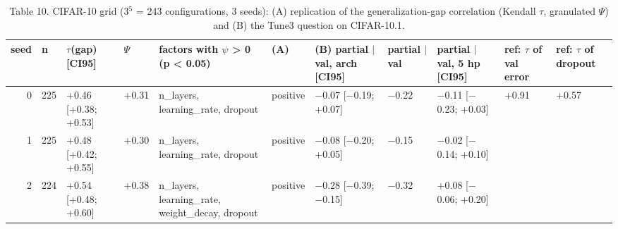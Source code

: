 \begin{table}[t]
\centering\small
\caption{Table 10. CIFAR-10 grid (3$^5$ = 243 configurations, 3 seeds): (A) replication of the generalization-gap correlation (Kendall $\tau$, granulated $\Psi$) and (B) the Tune3 question on CIFAR-10.1.}
\label{tab:cifar}
\begin{tabular}{rllllllllll}
\toprule
seed & n & $\tau$(gap) [CI95] & $\Psi$ & factors with $\psi$ > 0 (p < 0.05) & (A) & (B) partial $\mid$ val, arch [CI95] & partial $\mid$ val & partial $\mid$ val, 5 hp [CI95] & ref: $\tau$ of val error & ref: $\tau$ of dropout \\
\midrule
0 & 225 & +0.46 [+0.38; +0.53] & +0.31 & n\_layers, learning\_rate, dropout & positive & $-$0.07 [$-$0.19; +0.07] & $-$0.22 & $-$0.11 [$-$0.23; +0.03] & +0.91 & +0.57 \\
1 & 225 & +0.48 [+0.42; +0.55] & +0.30 & n\_layers, learning\_rate, dropout & positive & $-$0.08 [$-$0.20; +0.05] & $-$0.15 & $-$0.02 [$-$0.14; +0.10] &  &  \\
2 & 224 & +0.54 [+0.48; +0.60] & +0.38 & n\_layers, learning\_rate, weight\_decay, dropout & positive & $-$0.28 [$-$0.39; $-$0.15] & $-$0.32 & +0.08 [$-$0.06; +0.20] &  &  \\
\bottomrule
\end{tabular}
\end{table}

